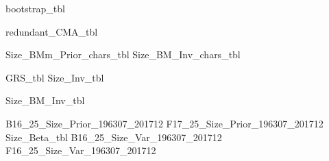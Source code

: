 



\begin{landscape}
{bootstrap_tbl}
\end{landscape}
{redundant_CMA_tbl}

{Size_BMm_Prior_chars_tbl}
{Size_BM_Inv_chars_tbl}

{GRS_tbl}
{Size_Inv_tbl}
\begin{landscape}
{Size_BM_Inv_tbl}
\end{landscape}
{B16_25_Size_Prior_196307_201712}
{F17_25_Size_Prior_196307_201712}
{Size_Beta_tbl}
{B16_25_Size_Var_196307_201712}
{F16_25_Size_Var_196307_201712}

